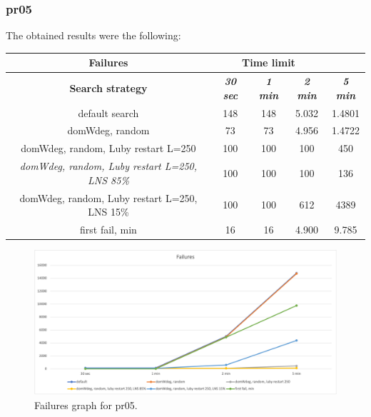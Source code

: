 \subsubsection{pr05}
The obtained results were the following:
{
\renewcommand{\arraystretch}{2}
\begin{longtable}[h]{| c | c | c | c | c |}
    \hline
    \textbf{Failures} & \multicolumn{3}{c}{Time limit} & \\
    \hline
    \textbf{Search strategy} & \textbf{\textit{30 sec}} & \textbf{\textit{1 min}} & \textbf{\textit{2 min}} & \textbf{\textit{5 min}} \\
    \hline
    \endhead
    default search                                         & 148 &  148 &  5.032 &  1.4801 \\
    \hline
    domWdeg, random                                        &  73 &   73 &  4.956 &  1.4722 \\
    \hline
    domWdeg, random, Luby restart L=250                    & 100 &  100 &   100 &    450 \\
    \hline
    \textit{domWdeg, random, Luby restart L=250, LNS 85\%} & 100 &  100 &   100 &    136 \\
    \hline
    domWdeg, random, Luby restart L=250, LNS 15\%          & 100 &  100 &   612 &   4389 \\
    \hline
    first fail, min                                        &  16 &   16 &  4.900 &   9.785 \\
    \hline
\end{longtable}
}
\begin{figure}[H]
    \centering
    \includegraphics[width=1.0\columnwidth]{../graphs/pr05-failures.png}
    \caption{Failures graph for pr05.}
\end{figure}

